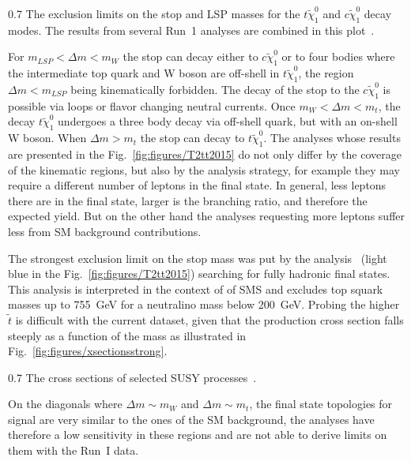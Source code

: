                  {0.7}       %
                { The exclusion limits on the stop and LSP masses for the $t \tilde{\chi}_{1}^0$ and $c \tilde{\chi}_{1}^0$ decay modes. The results from several Run~1 analyses are combined in this plot~\cite{website:SUSYresRunI}.   } %

For $m_{LSP} < \Delta m < m_{W}$ the stop can decay either to $c \tilde{\chi}_{1}^0$ or to four bodies where the intermediate top quark and W boson are off-shell in $t \tilde{\chi}_{1}^0$, the region $\Delta m < m_{LSP}$ being kinematically forbidden. The decay of the stop to the $c \tilde{\chi}_{1}^0$ is possible via loops or flavor changing neutral currents. Once $m_{W} < \Delta m < m_{t}$, the decay $t \tilde{\chi}_{1}^0$ undergoes a three body decay via off-shell quark, but with an on-shell W boson. When $\Delta m > m_{t}$ the stop can decay to $t \tilde{\chi}_{1}^0$. The analyses whose results are presented in the Fig.~\ref{fig:figures/T2tt2015} do not only differ by the coverage of the kinematic regions, but also by the analysis strategy, for example they may require a different number of leptons in the final state. In general, less leptons there are in the final state, larger is the branching ratio, and therefore the expected yield. But on the other hand the analyses requesting more leptons suffer less from SM background contributions.  

The strongest exclusion limit on the stop mass was put by the analysis~\cite{Khachatryan:2016oia} (light blue in the Fig.~\ref{fig:figures/T2tt2015}) searching for fully hadronic final states. This analysis is interpreted in the context of of SMS and excludes top squark masses up to 755~GeV for a neutralino mass  below 200~GeV. Probing the higher $\tilde{t}$ is difficult with the current dataset, given that the production cross section falls steeply as a function of the mass as illustrated in Fig.~\ref{fig:figures/xsectionsstrong}.
 
                 {0.7}       %
                 { The cross sections of selected SUSY processes~\cite{website:LHCxsec}. }


On the diagonals where $\Delta m \sim m_{W}$ and $\Delta m \sim m_{t}$, the final state topologies for signal are very similar to the ones of the SM background, the analyses have therefore a low sensitivity in these regions and are not able to derive limits on them with the Run~I data.

